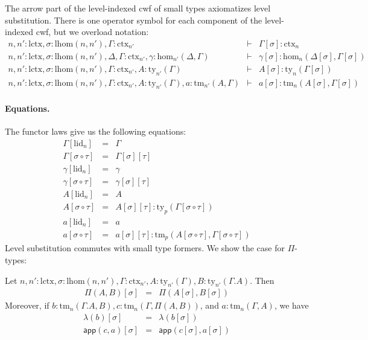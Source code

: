 \documentclass[11pt,a4paper]{article}
\theoremstyle{plain}
\theoremstyle{definition}
\newcommand{\app}[2]{{#1\,#2}} %
\def\lhom{\mathrm{lhom}}
\def\sub{\mathrm{hom}}
\def\lctx{\mathrm{lctx}}
\def\lid{\mathrm{lid}}
\newcommand{\ctx}{\mathrm{ctx}}
\newcommand{\ty}{\mathrm{ty}}
\newcommand{\tm}{\mathrm{tm}}
\def\app{\mathsf{app}}
\begin{document}
The arrow part of the level-indexed cwf of small types axiomatizes level substitution. There is one operator symbol for each component of the level-indexed cwf, but we overload notation:
\begin{eqnarray*}
n, n' : \lctx , \sigma : \lhom(n,n'), \Gamma : \ctx_{n'} &\vdash&
\Gamma[\sigma] : \ctx_n\\
n, n' : \lctx , \sigma : \lhom(n,n'), \Delta,\Gamma : \ctx_{n'}, \gamma : \sub_{n'}(\Delta,\Gamma)
&\vdash&
\gamma[\sigma] : \sub_{n}(\Delta[\sigma],\Gamma[\sigma]) \\
n, n' : \lctx , \sigma : \lhom(n,n'), \Gamma : \ctx_{n'}, A:\ty_{n'}(\Gamma)
&\vdash&
A[\sigma]: \ty_n(\Gamma[\sigma])\\
n,n' : \lctx , \sigma : \lhom(n,n'), \Gamma : \ctx_{n'}, A:\ty_{n'}(\Gamma), a : \tm_{n'}(A,\Gamma)
&\vdash&
a[\sigma] : \tm_{n}(A[\sigma],\Gamma[\sigma])
\end{eqnarray*}
\paragraph{Equations.}
The functor laws give us the following equations:
\begin{eqnarray*}
\Gamma[\lid_n] &=& \Gamma\\
\Gamma[\sigma \circ \tau] &=& \Gamma[\sigma][\tau]\\
\gamma[\lid_n] &=& \gamma\\
\gamma[\sigma \circ \tau] &=& \gamma[\sigma][\tau]\\
A[\lid_n] &=& A\\
A[\sigma \circ \tau] &=& A[\sigma][\tau]: \ty_p(\Gamma[\sigma \circ \tau])\\
a[\lid_n] &=& a\\
a[\sigma \circ \tau] &=& a[\sigma][\tau]: \tm_p(A[\sigma \circ \tau],\Gamma[\sigma \circ \tau])
\end{eqnarray*}
Level substitution commutes with small type formers. We show the case for $\Pi$-types:

Let $n, n' : \lctx , \sigma : \lhom(n,n'), \Gamma : \ctx_{n'}, A:\ty_{n'}(\Gamma), B:\ty_{n'}(\Gamma.A)$. Then
\begin{eqnarray*}
\Pi(A,B)[\sigma] &=& \Pi(A[\sigma],B[\sigma])
\end{eqnarray*}
Moreover, if $b : \tm_n(\Gamma.A,B), c :  \tm_n(\Gamma,\Pi(A,B))$,  and $a : \tm_n(\Gamma,A)$, we have
\begin{eqnarray*}
\lambda(b)[\sigma] &=&\lambda(b[\sigma])\\
\app(c,a)[\sigma] &=&\app(c[\sigma],a[\sigma])
\end{eqnarray*}
\end{document}
